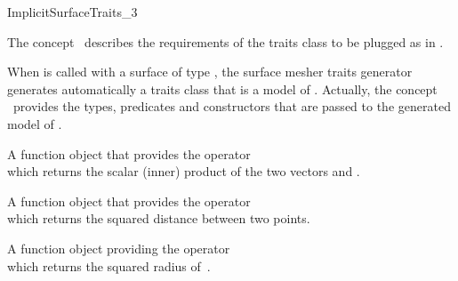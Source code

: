 

\begin{ccRefConcept}{ImplicitSurfaceTraits_3}

\ccDefinition
  
The concept \ccRefName\  describes the requirements of the traits class to
be plugged  as  in .


When  is called
with a surface of type ,
 the  surface mesher traits generator generates automatically
a traits class that is a model of .
Actually, 
the concept \ccRefName\  provides the types, predicates and constructors 
that are passed 
to the generated model of .


\ccTypes

\ccGlue
{}
\ccGlue
{}
\ccGlue
{}
\ccGlue
{}
\ccGlue
{}
\ccGlue
{}


{A function object that provides the operator\\
 which returns the scalar
(inner) product of the two vectors  and .}

{A function object that provides the operator\\
 which returns the squared distance
between two points.}

{A function object providing the operator\\
 which returns the squared radius
of~.}


\end{ccRefConcept}
